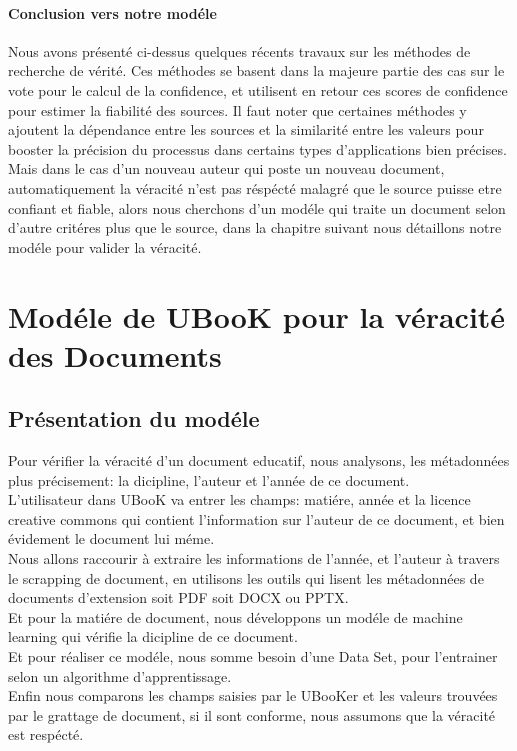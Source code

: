 \documentclass[12pt]{report}
\begin{document}
\subsubsection{Conclusion vers notre modéle}
Nous avons présenté ci-dessus quelques récents travaux sur les méthodes de recherche de vérité.
Ces méthodes se basent dans la majeure partie des cas sur le vote pour le calcul de la confidence,
et utilisent en retour ces scores de confidence pour estimer la fiabilité des sources. Il faut noter
que certaines méthodes y ajoutent la dépendance entre les sources et la similarité entre les valeurs
pour booster la précision du processus dans certains types d’applications bien précises.
\\
Mais dans le cas d'un nouveau auteur qui poste un nouveau document, automatiquement la véracité n'est pas réspécté malagré que le source puisse etre confiant et fiable, alors nous cherchons d'un modéle qui traite un document selon d'autre critéres plus que le source, dans la chapitre suivant nous détaillons notre modéle pour valider la véracité.
\newpage
\chapter{Modéle de UBooK pour la véracité des Documents}
\section{Présentation du modéle}

Pour vérifier la véracité d'un document educatif, nous analysons, les métadonnées plus précisement: la dicipline, l'auteur et l'année de ce document.\\
L'utilisateur dans UBooK va entrer les champs: matiére, année et la licence creative commons qui contient l'information sur l'auteur de ce document, et bien évidement le document lui méme.\\
Nous allons raccourir à extraire les informations de l'année, et l'auteur à travers le scrapping de document, en utilisons les outils qui lisent les métadonnées de documents d'extension soit PDF soit DOCX ou PPTX.\\
Et pour la matiére de document, nous développons un modéle de machine learning qui vérifie la dicipline de ce document.\\
Et pour réaliser ce modéle, nous somme besoin d'une Data Set, pour l'entrainer selon un algorithme d'apprentissage.\\
Enfin nous comparons les champs saisies par le UBooKer et les valeurs trouvées par le grattage de document, si il sont conforme, nous assumons que la véracité est respécté.\\
\end{document}
